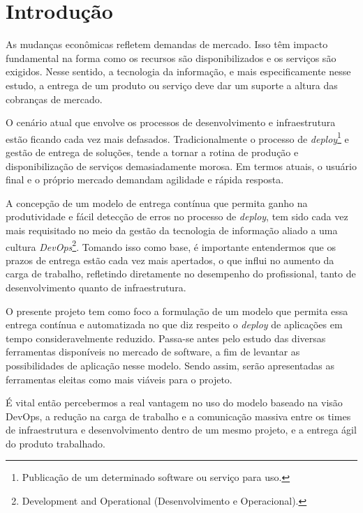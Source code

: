 

\chapter{Introdução}\label{intro}

As mudanças econômicas refletem demandas de mercado. Isso têm impacto fundamental na forma como os recursos são disponibilizados e os serviços são exigidos. Nesse sentido, a tecnologia da informação, e mais especificamente nesse estudo, a entrega de um produto ou serviço deve dar um suporte a altura das cobranças de mercado.

O cenário atual que envolve os processos de desenvolvimento e infraestrutura estão ficando cada vez mais defasados. Tradicionalmente o processo de \textit{deploy}\footnote{Publicação de um determinado software ou serviço para uso.} e gestão de entrega de soluções, tende a tornar a rotina de produção e disponibilização de serviços demasiadamente morosa. Em termos atuais, o usuário final e o próprio mercado demandam agilidade e rápida resposta.

A concepção de um modelo de entrega contínua que permita ganho na produtividade e fácil detecção de erros no processo de \textit{deploy}, tem sido cada vez mais requisitado no meio da gestão da tecnologia de informação aliado a uma cultura \textit{DevOps}\footnote{Development and Operational (Desenvolvimento e Operacional).}. Tomando isso como base, é importante entendermos que os prazos de entrega estão cada vez mais apertados, o que influi no aumento da carga de trabalho, refletindo diretamente no desempenho do profissional, tanto de desenvolvimento quanto de infraestrutura.

O presente projeto tem como foco a formulação de um modelo que permita essa entrega contínua e automatizada no que diz respeito o \textit{deploy} de aplicações em tempo consideravelmente reduzido. Passa-se antes pelo estudo das diversas ferramentas disponíveis no mercado de software, a fim de levantar as possibilidades de aplicação nesse modelo. Sendo assim, serão apresentadas as ferramentas eleitas como mais viáveis para o projeto.

É vital então percebermos a real vantagem no uso do modelo baseado na visão DevOps, a redução na carga de trabalho e a comunicação massiva entre os times de infraestrutura e desenvolvimento dentro de um mesmo projeto, e a entrega ágil do produto trabalhado.


